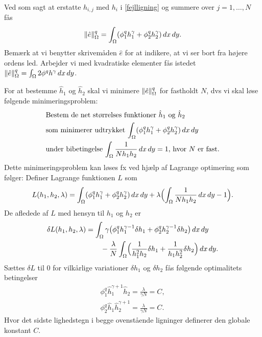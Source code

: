 Ved som sagt at erstatte $h_{i,j}$ med $h_i$ i \eqref{fejlligning} og
summere over $j=1,\ldots,N$ fås
\begin{equation}
  \|\hat{e}\|^q_{\Omega} = \int_{\Omega} (\phi_1^q h_1^{\gamma} + 
  \phi_2^q h_2^{\gamma})\, dx\, dy.
\end{equation}
Bemærk at vi benytter skrivemåden $\hat{e}$ for at indikere, at vi ser
bort fra højere ordens led. Arbejder vi med kvadratiske elementer fås
istedet $\|\hat{e}\|^q_{\Omega} = \int_{\Omega} 2\phi^q h^\gamma\, dx\, dy$.

For at bestemme $\hat{h}_1$ og $\hat{h}_2$ skal vi minimere
$\|\hat{e}\|^q_{\Omega}$ for fastholdt $N$, dvs vi skal løse følgende
minimeringsproblem:
\begin{align} \label{minimum}
  &\text{Bestem de net størrelses funktioner $\hat{h}_1$ og 
    $\hat{h}_2$} \\
  &\text{som minimerer udtrykket $\int_{\Omega} (\phi_1^q h_1^{\gamma} + 
    \phi_2^q h_2^{\gamma})\, dx\, dy$}  \notag \\
  &\text{under bibetingelse $\int_{\Omega} \frac{1}{Nh_1h_2}\, dx\, dy=1$,
    hvor $N$ er fast.} \notag
\end{align}
Dette minimeringsproblem kan løses fx ved hjælp af Lagrange optimering
som følger: Definer Lagrange funktionen $L$ som
\begin{equation}
  L(h_1,h_2,\lambda) = \int_{\Omega} (\phi_1^q h_1^\gamma + 
  \phi_2^q h_2^\gamma )\, dx\, dy + \lambda \Bigl(
  \int_{\Omega} \frac{1}{Nh_1h_2}\, dx\, dy -1 \Bigr). 
\end{equation}
De afledede af $L$ med hensyn til $h_1$ og $h_2$ er
\begin{align}
  \delta L(h_1,h_2,\lambda) &= 
    \int_{\Omega} \gamma\bigl( \phi_1^q h_1^{\gamma -1}\delta h_1 + 
  \phi_2^q h_2^{\gamma -1} \delta h_2 \bigr)\, dx\, dy \\
  &\phantom{=\int} -\frac{\lambda}{N} \int_{\Omega} \Bigl(
    \frac{1}{h_1^2 h_2} \delta h_1 + \frac{1}{h_1 h_2^2} \delta h_2
    \Bigr)\, dx\, dy . \notag  
\end{align}
Sættes $\delta L$ til $0$ for vilkårlige variationer $\delta h_1$ og
$\delta h_2$ fås følgende optimalitets betingelser 
\begin{gather}
  \phi_1^q \hat{h}_1^{\gamma +1} \hat{h}_2 = 
    \frac{\lambda}{\gamma N} = C, \label{opc1} \\
  \phi_2^q \hat{h}_1 \hat{h}_2^{\gamma +1} = 
    \frac{\lambda}{\gamma N} = C. \label{opc2}
\end{gather}
Hvor det sidste lighedstegn i begge ovenstående ligninger definerer
den globale konstant $C$.

